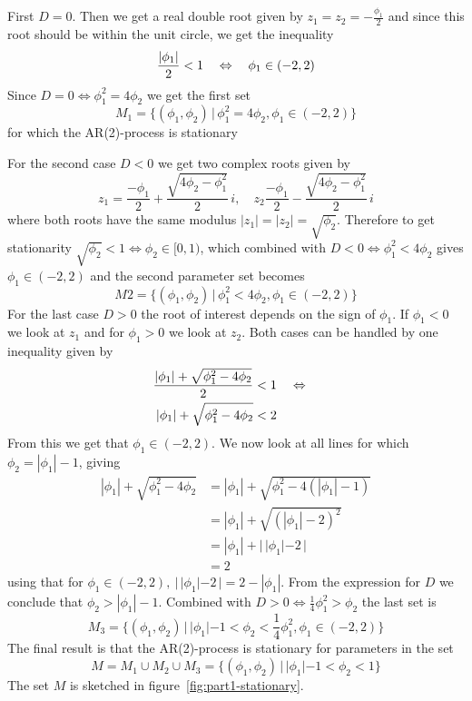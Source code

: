 First $D=0$. Then we get a real double root given by $z_1=z_2=-\frac{\phi_1}{2}$ and since this root should be within the unit circle, we get the inequality
\begin{equation*}
    \frac{|\phi_1|}{2} < 1 \quad\Leftrightarrow\quad \phi_1\in(-2, 2)
\end{equation*}
Since $D=0\Leftrightarrow\phi_1^2=4\phi_2$ we get the first set
\begin{equation*}
    M_1 = \{(\phi_1, \phi_2) \,|\, \phi_1^2=4\phi_2, \phi_1\in(-2,2)\}
\end{equation*}
for which the AR(2)-process is stationary \par
    For the second case $D<0$ we get two complex roots given by
\begin{equation*}
    z_1 = \frac{-\phi_1}{2} + \frac{\sqrt{4\phi_2 - \phi_1^2}}{2}\,i,\quad z_2\frac{-\phi_1}{2} - \frac{\sqrt{4\phi_2 - \phi_1^2}}{2}\,i
\end{equation*}
where both roots have the same modulus $|z_1|=|z_2|=\sqrt{\phi_2}$. Therefore to get stationarity $\sqrt{\phi_2}<1\Leftrightarrow\phi_2\in[0,1)$, which combined with $D<0 \Leftrightarrow \phi_1^2<4\phi_2$ gives $\phi_1\in(-2,2)$ and the second parameter set becomes
\begin{equation*}
    M2 = \{(\phi_1, \phi_2) \,|\, \phi_1^2<4\phi_2, \phi_1\in(-2,2)\}
\end{equation*}
For the last case $D>0$ the root of interest depends on the sign of $\phi_1$. If $\phi_1<0$ we look at $z_1$ and for $\phi_1>0$ we look at $z_2$. Both cases can be handled by one inequality given by
\begin{align*}
    \frac{|\phi_1| + \sqrt{\phi_1^2 - 4\phi_2}}{2} &< 1 \quad\Leftrightarrow\quad\\
    |\phi_1| + \sqrt{\phi_1^2 - 4\phi_2} &< 2
\end{align*}
From this we get that $\phi_1\in(-2,2)$. We now look at all lines for which $\phi_2=|\phi_1|-1$, giving
\begin{align*}
    |\phi_1| + \sqrt{\phi_1^2 - 4\phi_2} &= |\phi_1| + \sqrt{\phi_1^2 - 4(|\phi_1|-1)} \\
    &= |\phi_1| + \sqrt{(|\phi_1|-2)^2} \\
    &= |\phi_1| + |\,|\phi_1|-2\,| \\
    &= 2
\end{align*}
using that for $\phi_1\in(-2,2),\:|\,|\phi_1|-2\,|=2-|\phi_1|$. From the expression for $D$ we conclude that $\phi_2>|\phi_1|-1$. Combined with $D>0\Leftrightarrow \frac{1}{4}\phi_1^2>\phi_2$ the last set is
\begin{equation*}
    M_3 = \{(\phi_1, \phi_2) \,|\, |\phi_1|-1<\phi_2<\frac{1}{4}\phi_1^2, \phi_1\in(-2,2)\}
\end{equation*}
The final result is that the AR(2)-process is stationary for parameters in the set
\begin{equation*}
    M = M_1 \cup M_2 \cup M_3 = \{(\phi_1, \phi_2) \,|\, |\phi_1| - 1 < \phi_2 < 1\}
\end{equation*}
The set $M$ is sketched in figure~\ref{fig:part1-stationary}. \par

